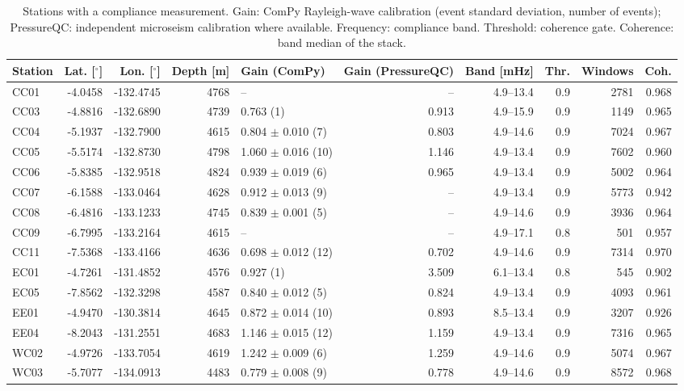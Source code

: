 \documentclass[10pt,a4paper,twocolumn]{article}
\begin{document}
\begin{table}
\centering\small
\caption{Stations with a compliance measurement. Gain: ComPy Rayleigh-wave calibration (event standard deviation, number of events); PressureQC: independent microseism calibration where available. Frequency: compliance band. Threshold: coherence gate. Coherence: band median of the stack.}
\label{tab:stations}
\begin{tabular}{lrrrlrrrrr}
\toprule
Station & Lat. [$^\circ$] & Lon. [$^\circ$] & Depth [m] & Gain (ComPy) & Gain (PressureQC) & Band [mHz] & Thr. & Windows & Coh. \\
\midrule
CC01 & -4.0458 & -132.4745 & 4768 & -- & -- & 4.9--13.4 & 0.9 & 2781 & 0.968 \\
CC03 & -4.8816 & -132.6890 & 4739 & 0.763 (1) & 0.913 & 4.9--15.9 & 0.9 & 1149 & 0.965 \\
CC04 & -5.1937 & -132.7900 & 4615 & 0.804 $\pm$ 0.010 (7) & 0.803 & 4.9--14.6 & 0.9 & 7024 & 0.967 \\
CC05 & -5.5174 & -132.8730 & 4798 & 1.060 $\pm$ 0.016 (10) & 1.146 & 4.9--13.4 & 0.9 & 7602 & 0.960 \\
CC06 & -5.8385 & -132.9518 & 4824 & 0.939 $\pm$ 0.019 (6) & 0.965 & 4.9--13.4 & 0.9 & 5002 & 0.964 \\
CC07 & -6.1588 & -133.0464 & 4628 & 0.912 $\pm$ 0.013 (9) & -- & 4.9--13.4 & 0.9 & 5773 & 0.942 \\
CC08 & -6.4816 & -133.1233 & 4745 & 0.839 $\pm$ 0.001 (5) & -- & 4.9--14.6 & 0.9 & 3936 & 0.964 \\
CC09 & -6.7995 & -133.2164 & 4615 & -- & -- & 4.9--17.1 & 0.8 & 501 & 0.957 \\
CC11 & -7.5368 & -133.4166 & 4636 & 0.698 $\pm$ 0.012 (12) & 0.702 & 4.9--14.6 & 0.9 & 7314 & 0.970 \\
EC01 & -4.7261 & -131.4852 & 4576 & 0.927 (1) & 3.509 & 6.1--13.4 & 0.8 & 545 & 0.902 \\
EC05 & -7.8562 & -132.3298 & 4587 & 0.840 $\pm$ 0.012 (5) & 0.824 & 4.9--13.4 & 0.9 & 4093 & 0.961 \\
EE01 & -4.9470 & -130.3814 & 4645 & 0.872 $\pm$ 0.014 (10) & 0.893 & 8.5--13.4 & 0.9 & 3207 & 0.926 \\
EE04 & -8.2043 & -131.2551 & 4683 & 1.146 $\pm$ 0.015 (12) & 1.159 & 4.9--13.4 & 0.9 & 7316 & 0.965 \\
WC02 & -4.9726 & -133.7054 & 4619 & 1.242 $\pm$ 0.009 (6) & 1.259 & 4.9--14.6 & 0.9 & 5074 & 0.967 \\
WC03 & -5.7077 & -134.0913 & 4483 & 0.779 $\pm$ 0.008 (9) & 0.778 & 4.9--14.6 & 0.9 & 8572 & 0.968 \\

\end{tabular}
\end{table}
\end{document}
